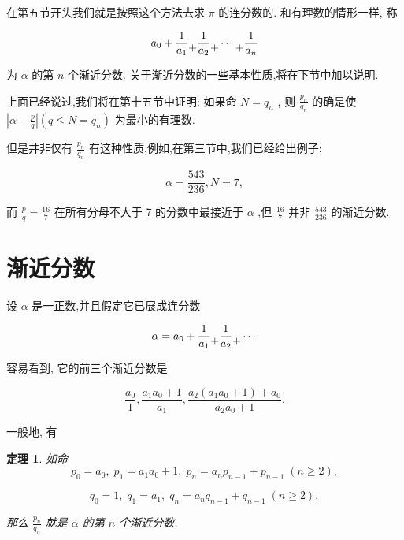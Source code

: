 \documentclass{ctexart}
\newcommand{\cplus}{\raisebox{-1ex}{+}}
\newtheorem{theorem}{\indent 定理}[section]
\begin{document}
在第五节开头我们就是按照这个方法去求 \(\pi\) 的连分数的. 和有理数的情形一样, 称

\[
{a}_{0} + \frac{1}{{a}_{1}} \cplus \frac{1}{{a}_{2}}  \cplus \cdots  \cplus \frac{1}{{a}_{n}}
\]

为 \(\alpha\) 的第 \(n\) 个渐近分数. 关于渐近分数的一些基本性质,将在下节中加以说明.

上面已经说过,我们将在第十五节中证明: 如果命 \(N = {q}_{n}\) , 则 \(\frac{{p}_{n}}{{q}_{n}}\) 的确是使 \(\left| {\alpha - \frac{p}{q}}\right| \left( {q \leq N = {q}_{n}}\right)\) 为最小的有理数.

但是井非仅有 \(\frac{{p}_{n}}{{q}_{n}}\) 有这种性质,例如,在第三节中,我们已经给出例子:

\[
\alpha = \frac{543}{236},N = 7,
\]

而 \(\frac{p}{q} = \frac{16}{7}\) 在所有分母不大于 7 的分数中最接近于 \(\alpha\) ,但 \(\frac{16}{7}\) 并非 \(\frac{543}{236}\) 的渐近分数.

\section{渐近分数}

设 \(\alpha\) 是一正数,并且假定它已展成连分数

\[
\alpha = {a}_{0} + \frac{1}{{a}_{1}} \cplus \frac{1}{{a}_{2}} \cplus \cdots
\]

容易看到, 它的前三个渐近分数是

\[
\frac{{a}_{0}}{1},\frac{{a}_{1}{a}_{0} + 1}{{a}_{1}},\frac{{a}_{2}\left( {{a}_{1}{a}_{0} + 1}\right) + {a}_{0}}{{a}_{2}{a}_{0} + 1}.
\]

一般地, 有
\begin{theorem}
  \label{thm:1}
  如命
\[
{p}_{0} = {a}_{0},\;{p}_{1} = {a}_{1}{a}_{0} + 1,\;{p}_{n} = {a}_{n}{p}_{n - 1} + {p}_{n - 1}\;\left( {n \geq 2}\right) ,
\]

\[
{q}_{0} = 1,\;{q}_{1} = {a}_{1},\;{q}_{n} = {a}_{n}{q}_{n - 1} + {q}_{n - 1}\;\left( {n \geq 2}\right) ,
\]

那么 \(\frac{{p}_{n}}{{q}_{n}}\) 就是 \(\alpha\) 的第 \(n\) 个渐近分数.
\end{theorem}
\end{document}
